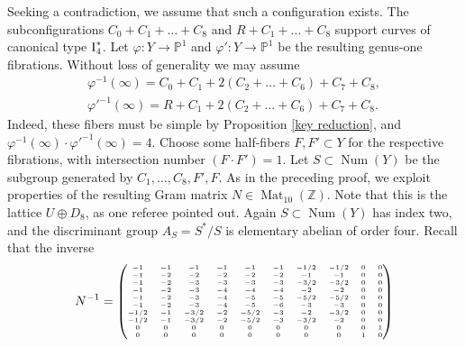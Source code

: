 \documentclass[oneside, 12pt]{amsart}
\theoremstyle{definition}
\theoremstyle{remark}
\newcommand{\ZZ}{\mathbb{Z}}
\newcommand{\PP}{\mathbb{P}}
\newcommand{\I}{\text{\rm I}}
\newcommand{\Mat}{\operatorname{Mat}}
\newcommand{\Num}{\operatorname{Num}}
\newcommand{\ra}{\rightarrow}
\newcommand{\inv}{{-1}}
\begin{document}
\proof
Seeking a contradiction, we assume that such a configuration exists. 
The subconfigurations  $C_0+C_1+\ldots+C_8$ and $R+C_1+\ldots+C_8$ support
curves of canonical type $\I_4^*$. Let $\varphi:Y\ra \PP^1$ and $\varphi':Y\ra\PP^1$
be the resulting genus-one fibrations. Without loss of generality we may assume
\begin{gather*}
\varphi^\inv(\infty) = C_0+C_1+2(C_2+\ldots+C_6)+C_7+C_8,\\
\varphi'^\inv(\infty) = R+C_1+2(C_2+\ldots+C_6)+C_7+C_8.
\end{gather*}
Indeed, these fibers must be simple by Proposition \ref{key reduction}, and   $\varphi^\inv(\infty)\cdot \varphi'^\inv(\infty)=4$.
Choose some half-fibers $F,F'\subset Y$ for the respective fibrations, with intersection number  $(F\cdot F')=1$.
Let $S\subset \Num(Y)$ be the subgroup generated by $C_1,\ldots,C_8,F',F$. 
As in the preceding proof, we exploit   properties of the resulting Gram matrix $N\in\Mat_{10}(\ZZ)$.
Note that this is the lattice $U\oplus D_8$, as one referee pointed out. 
%    
%    
% 
% 
%
Again    $S\subset \Num(Y)$ has index two, and the discriminant   group $A_S=S^*/S$  is elementary abelian of order four.
Recall that the inverse
\begin{equation}
\label{gram matrix second}
N^{-1}=
{\tiny
\begin{pmatrix}  
-1   &-1   &-1   &-1   &-1   &-1 &-1/2 &-1/2    &0    &0\\
-1   &-2   &-2   &-2   &-2   &-2   &-1   &-1    &0    &0\\
-1   &-2   &-3   &-3   &-3   &-3 &-3/2 &-3/2    &0    &0\\
-1   &-2   &-3   &-4   &-4   &-4   &-2   &-2    &0    &0\\
-1   &-2   &-3   &-4   &-5   &-5 &-5/2 &-5/2    &0    &0\\
-1   &-2   &-3   &-4   &-5   &-6   &-3   &-3    &0    &0\\
-1/2 &-1 &-3/2   &-2 &-5/2   &-3   &-2 &-3/2    &0    &0\\
-1/2 &-1 &-3/2   &-2 &-5/2   &-3 &-3/2   &-2    &0    &0\\
0    &0    &0    &0    &0    &0    &0    &0     &0    &1\\
0    &0    &0    &0    &0    &0    &0    &0     &1    &0\\
\end{pmatrix}
}
\end{equation}
\end{document}
